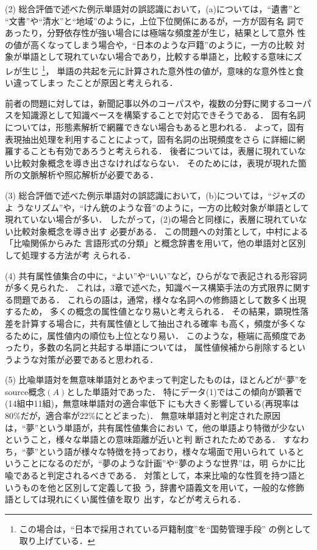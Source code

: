 (2)
総合評価で述べた例示単語対の誤認識において，(a)については，``遺書''と
``文書''や``清水''と``地域''のように，上位下位関係にあるが，一方が固有名
詞であったり，分野依存性が強い場合には極端な頻度差が生じ，結果として意外
性の値が高くなってしまう場合や，``日本のような戸籍''のように，一方の比較
対象が単語として現れていない場合であり，比較する単語と，比較する意味にズ
レが生じ
\footnote{この場合は，``日本で採用されている戸籍制度''を``国勢管理手段''
の例として取り上げている．}，
単語の共起を元に計算された意外性の値が，意味的な意外性と食い違ってしまっ
たことが原因と考えられる．

前者の問題に対しては，新聞記事以外のコーパスや，複数の分野に関するコーパ
スを知識源として知識ベースを構築することで対応できそうである．
固有名詞については，形態素解析で網羅できない場合もあると思われる．
よって，固有表現抽出処理を利用することによって，固有名詞の出現頻度をさら
に詳細に網羅することも有効であろうと考えられる．
後者については，表層に現れていない比較対象概念を導き出さなければならない．
そのためには，表現が現れた箇所の文脈解析や照応解析が必要である．

(3)
総合評価で述べた例示単語対の誤認識において，(b)については，``ジャズのよ
うなリズム''や，``けん銃のような音''のように，一方の比較対象が単語として
現れていない場合が多い．
したがって，(2)の場合と同様に，表層に現れていない比較対象概念を導き出す
必要がある．
この問題への対策として，中村\cite{Nakamura1977}による「比喩関係からみた
言語形式の分類」と概念辞書を用いて，他の単語対と区別して処理する方法が考
えられる．

(4)
共有属性値集合の中に，``よい''や``いい''など，ひらがなで表記される形容詞
が多く見られた．
これは，3章で述べた，知識ベース構築手法の方式限界に関する問題である．
これらの語は，通常，様々な名詞への修飾語として数多く出現するため，
多くの概念の属性値となり易いと考えられる．
その結果，顕現性落差を計算する場合に，共有属性値として抽出される確率
も高く，頻度が多くなるために，属性値内の順位も上位となり易い．
このような，極端に高頻度であったり，多数の名詞と共起する単語については，
属性値候補から削除するというような対策が必要であると思われる．

(5)
比喩単語対を無意味単語対とあやまって判定したものは，ほとんどが``夢''を
source概念$(A)$とした単語対であった．
特にデータ(1)ではこの傾向が顕著で(14組中11組)，無意味単語対の適合率低下
にも大きく影響している(再現率は80\%だが，適合率が22\%にとどまった)．
無意味単語対と判定された原因は，``夢''という単語が，共有属性値集合におい
て，他の単語より特徴が少ないということ，様々な単語との意味距離が近いと判
断されたためである．
すなわち，``夢''という語が様々な特徴を持っており，様々な場面で用いられて
いるということになるのだが，``夢のような計画''や``夢のような世界''は，明
らかに比喩であると判定されるべきである．
対策として，本来比喩的な性質を持つ語というものを他と区別して定義して扱
う，辞書や語義文を用いて，一般的な修飾語としては現れにくい属性値を取り
出す，などが考えられる．

